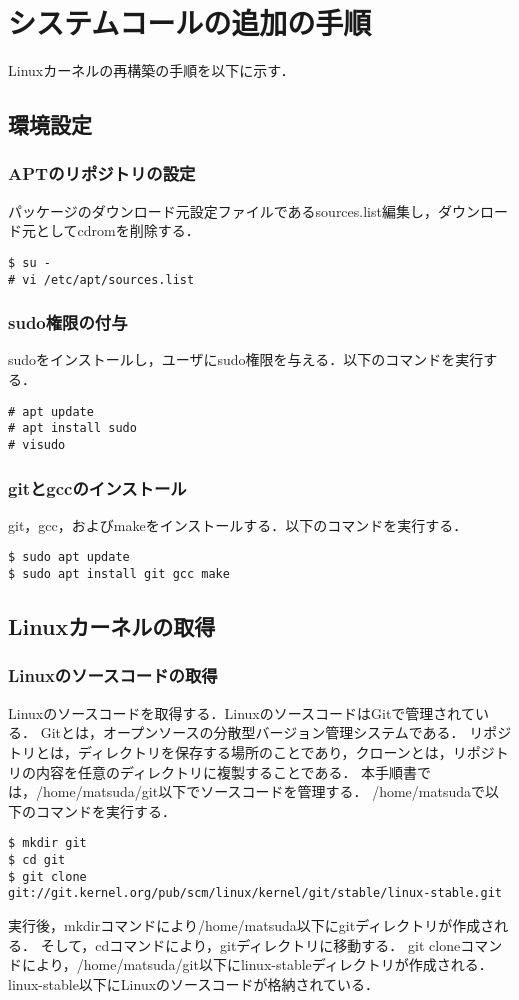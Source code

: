 \documentclass[12pt]{jsarticle}
\begin{document}
\section{システムコールの追加の手順}
Linuxカーネルの再構築の手順を以下に示す．
\subsection{環境設定}
\subsubsection{APTのリポジトリの設定}
パッケージのダウンロード元設定ファイルであるsources.list編集し，ダウンロード元としてcdromを削除する．
\begin{verbatim}
$ su -
# vi /etc/apt/sources.list
\end{verbatim}

\subsubsection{sudo権限の付与}
sudoをインストールし，ユーザにsudo権限を与える．以下のコマンドを実行する．
\begin{verbatim}
# apt update
# apt install sudo 
# visudo
\end{verbatim}

\subsubsection{gitとgccのインストール}
git，gcc，およびmakeをインストールする．以下のコマンドを実行する．
\begin{verbatim}
$ sudo apt update
$ sudo apt install git gcc make
\end{verbatim}

\subsection{Linuxカーネルの取得}
\subsubsection{Linuxのソースコードの取得}
Linuxのソースコードを取得する．LinuxのソースコードはGitで管理されている．
Gitとは，オープンソースの分散型バージョン管理システムである．
リポジトリとは，ディレクトリを保存する場所のことであり，クローンとは，リポジトリの内容を任意のディレクトリに複製することである．
本手順書では，/home/matsuda/git以下でソースコードを管理する．
/home/matsudaで以下のコマンドを実行する．
\begin{verbatim}
$ mkdir git
$ cd git
$ git clone git://git.kernel.org/pub/scm/linux/kernel/git/stable/linux-stable.git
\end{verbatim}
実行後，mkdirコマンドにより/home/matsuda以下にgitディレクトリが作成される．
そして，cdコマンドにより，gitディレクトリに移動する．
git cloneコマンドにより，/home/matsuda/git以下にlinux-stableディレクトリが作成される．
linux-stable以下にLinuxのソースコードが格納されている．
\end{document}
